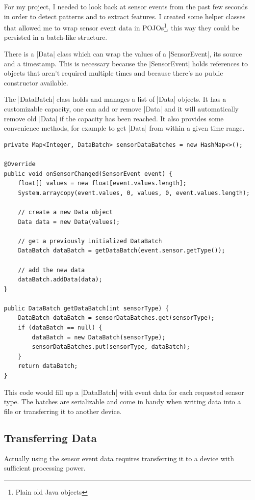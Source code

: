 For my project, I needed to look back at sensor events from the past few seconds in order to detect patterns and to extract features.
I created some helper classes\cite{sensordatalogger:datapackage} that allowed me to wrap sensor event data in POJOs\footnote{Plain old Java objects}, this way they could be persisted in a batch-like structure.

There is a |Data|\cite{sensordatalogger:data} class which can wrap the values of a |SensorEvent|, its source and a timestamp.
This is necessary because the |SensorEvent| holds references to objects that aren't required multiple times and because there's no public constructor available.

The |DataBatch|\cite{sensordatalogger:databatch} class holds and manages a list of |Data| objects.
It has a customizable capacity, one can add or remove |Data| and it will automatically remove old |Data| if the capacity has been reached.
It also provides some convenience methods, for example to get |Data| from within a given time range.

\begin{lstlisting}[label=datahelperclasses]
private Map<Integer, DataBatch> sensorDataBatches = new HashMap<>();

@Override
public void onSensorChanged(SensorEvent event) {
	float[] values = new float[event.values.length];
	System.arraycopy(event.values, 0, values, 0, event.values.length);

	// create a new Data object
	Data data = new Data(values);

	// get a previously initialized DataBatch
	DataBatch dataBatch = getDataBatch(event.sensor.getType());

	// add the new data
	dataBatch.addData(data);
}

public DataBatch getDataBatch(int sensorType) {
	DataBatch dataBatch = sensorDataBatches.get(sensorType);
	if (dataBatch == null) {
		dataBatch = new DataBatch(sensorType);
		sensorDataBatches.put(sensorType, dataBatch);
	}
	return dataBatch;
}
\end{lstlisting}

This code would fill up a |DataBatch| with event data for each requested sensor type.
The batches are serializable and come in handy when writing data into a file or transferring it to another device.

\subsection{Transferring Data}
Actually using the sensor event data requires transferring it to a device with sufficient processing power.

